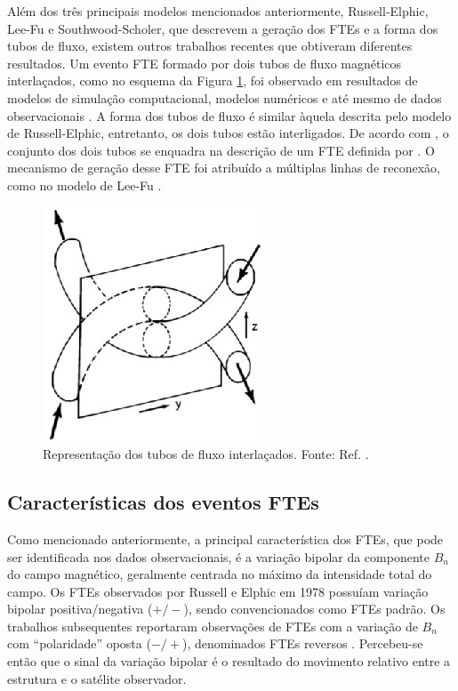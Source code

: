Além dos três principais modelos mencionados anteriormente, Russell-Elphic, Lee-Fu e Southwood-Scholer, que descrevem a geração dos FTEs e a forma dos tubos de fluxo, existem outros trabalhos recentes que obtiveram diferentes resultados. Um evento FTE formado por dois tubos de fluxo magnéticos interlaçados, como no esquema da Figura \ref{hesse}, foi observado em resultados de modelos de simulação computacional, modelos numéricos e até mesmo de dados observacionais \cite{hesse1990,lee1993,otto1995,louarn2004,cardoso2013}. A forma dos tubos de fluxo é similar àquela descrita pelo modelo de Russell-Elphic, entretanto, os dois tubos estão interligados. De acordo com \cite{cardoso2013}, o conjunto dos dois tubos se enquadra na descrição de um FTE definida por \cite{elphic1978}. O mecanismo de geração desse FTE foi atribuído a múltiplas linhas de reconexão, como no modelo de Lee-Fu \cite{cardoso2013}.

\begin{figure}
	\begin{center}
		\includegraphics[scale=0.6]{hesse.jpg}
		\caption{Representação dos tubos de fluxo interlaçados. Fonte: Ref. \cite{hesse1990}. }
		\label{hesse}
	\end{center}
\end{figure}


\subsection{Características dos eventos FTEs}
\label{caracteristicas}

Como mencionado anteriormente, a principal característica dos FTEs, que pode ser identificada nos dados observacionais, é a variação bipolar da componente $B_{n}$ do 
campo magnético, geralmente centrada no máximo da intensidade total do campo. Os FTEs observados por Russell e Elphic em 1978 possuíam variação bipolar positiva/negativa 
($+/-$), sendo convencionados como FTEs padrão. Os trabalhos subsequentes reportaram observações de FTEs com a variação de $B_{n}$ com ``polaridade'' oposta ($-/+$),
denominados FTEs reversos \cite{Rijnbeeketal1982}. Percebeu-se então que o  sinal da variação bipolar é o resultado do movimento relativo entre a estrutura e o
satélite observador. 

